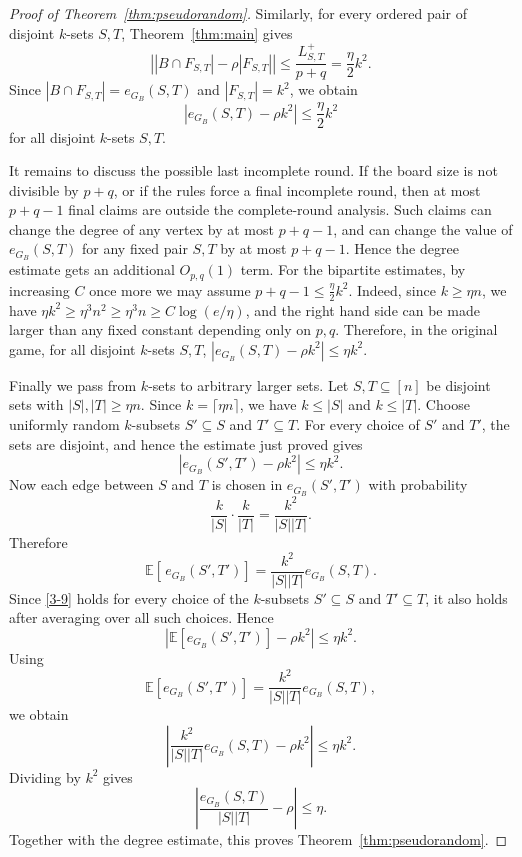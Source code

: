 \documentclass[twoside,12pt]{article}
\numberwithin{equation}{section}
\begin{document}
\begin{proof}[Proof of Theorem~\ref{thm:pseudorandom}]
Similarly, for every ordered pair of disjoint $k$-sets $S,T$, Theorem~\ref{thm:main}
gives
\[
        \left|
        |B\cap F_{S,T}|-\rho |F_{S,T}|
        \right|
        \le
        \frac{L_{S,T}^+}{p+q}
        =
        \frac{\eta}{2}k^2.
\]
Since
$|B\cap F_{S,T}|=e_{G_B}(S,T)$
and $|F_{S,T}|=k^2$,
we obtain
\[
        \left|
        e_{G_B}(S,T)-\rho k^2
        \right|
        \le
        \frac{\eta}{2}k^2
\]
for all disjoint $k$-sets $S,T$.

It remains to discuss the possible last incomplete round.  If the board size is not
divisible by $p+q$, or if the rules force a final incomplete round, then at most
$p+q-1$ final claims are outside the complete-round analysis.  Such claims can change
the degree of any vertex by at most $p+q-1$, and can change the value of
$e_{G_B}(S,T)$ for any fixed pair $S,T$ by at most $p+q-1$.  Hence the degree estimate
gets an additional $O_{p,q}(1)$ term.  For the bipartite estimates, by increasing
$C$ once more we may assume
$p+q-1\le \frac{\eta}{2}k^2$.
Indeed, since $k\ge\eta n$, we have
$ \eta k^2\ge \eta^3 n^2\ge \eta^3 n\ge C\log(e/\eta)$,
and the right hand side can be made larger than any fixed constant depending only on
$p,q$.  Therefore, in the original game, for all disjoint $k$-sets $S,T$,
$\left|
        e_{G_B}(S,T)-\rho k^2
        \right|
        \le
        \eta k^2$.

Finally we pass from $k$-sets to arbitrary larger sets.  Let $S,T\subseteq[n]$ be
disjoint sets with
        $|S|,|T|\ge\eta n$.
Since $k=\lceil\eta n\rceil$, we have $k\le |S|$ and $k\le |T|$.  Choose uniformly
random $k$-subsets
$S'\subseteq S$ and
        $T'\subseteq T$.
For every choice of $S'$ and $T'$, the sets are disjoint, and hence the estimate just
proved gives
\begin{equation}\label{3-9}
\left|
        e_{G_B}(S',T')-\rho k^2
        \right|
        \le
        \eta k^2.
\end{equation}
Now each edge between $S$ and $T$ is
chosen in $e_{G_B}(S',T')$ with probability
\[
        \frac{k}{|S|}\cdot\frac{k}{|T|}
        =
        \frac{k^2}{|S||T|}.
\]
Therefore
\[
        \mathbb E[\,e_{G_B}(S',T')]
        =
        \frac{k^2}{|S||T|}e_{G_B}(S,T).
\]
Since \eqref{3-9}
holds for every choice of the \(k\)-subsets \(S'\subseteq S\) and
\(T'\subseteq T\), it also holds after averaging over all such choices. Hence
\[
        \left|
        \mathbb E [e_{G_B}(S',T')]-\rho k^2
        \right|
        \le
        \eta k^2 .
\]
Using
\[
        \mathbb E [e_{G_B}(S',T')]
        =
        \frac{k^2}{|S||T|}e_{G_B}(S,T),
\]
we obtain
\[
        \left|
        \frac{k^2}{|S||T|}e_{G_B}(S,T)-\rho k^2
        \right|
        \le
        \eta k^2 .
\]
Dividing by $k^2$ gives
\[
        \left|
        \frac{e_{G_B}(S,T)}{|S||T|}-\rho
        \right|
        \le
        \eta.
\]
Together with the degree estimate, this proves Theorem~\ref{thm:pseudorandom}.
\end{proof}
\end{document}
